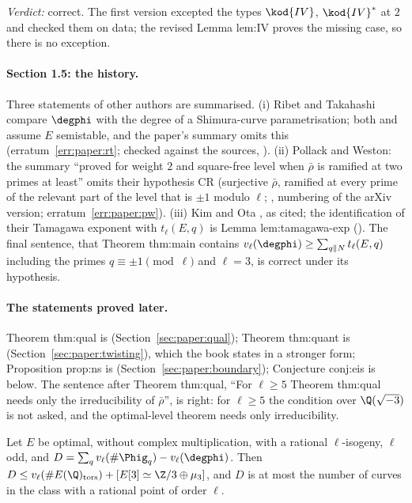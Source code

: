\begin{sloppypar}
\noindent\emph{Verdict:} correct. The first version excepted the types $\kod{IV}$, $\kod{IV}^*$ at $2$ and checked them on data; the revised Lemma lem:IV proves the
missing case, so there is no exception.

\paragraph{Section 1.5: the history.} Three statements of other authors are summarised. (i) Ribet and Takahashi compare $\degphi$ with the degree of a
Shimura-curve parametrisation; both \cite{RibetTakahashi97} and \cite{Takahashi01} assume $E$ semistable, and the paper's summary omits this
(erratum~\ref{err:paper:rt}; checked against the sources, ). (ii) Pollack and Weston: the summary ``proved for weight $2$ and square-free level
when $\bar\rho$ is ramified at two primes at least'' omits their hypothesis CR (surjective $\bar\rho$, ramified at every prime of the relevant part of the level
that is $\pm1$ modulo $\ell$; \cite[Section 1 and Theorem 6.11]{PollackWeston11}, numbering of the arXiv version; erratum~\ref{err:paper:pw}). (iii) Kim and Ota
\cite[Theorem 1.1]{KimOta}, as cited; the identification of their Tamagawa exponent with $t_\ell(E,q)$ is Lemma lem:tamagawa-exp (). The
final sentence, that Theorem thm:main contains $v_\ell(\degphi)\ge\sum_{q\|N}t_\ell(E,q)$ including the primes $q\equiv\pm1\pmod\ell$ and $\ell=3$, is correct under its
hypothesis.

\paragraph{The statements proved later.} Theorem thm:qual is  (Section~\ref{sec:paper:qual}); Theorem thm:quant is
 (Section~\ref{sec:paper:twisting}), which the book states in a stronger form; Proposition prop:ns is 
(Section~\ref{sec:paper:boundary}); Conjecture conj:eis is  below. The sentence after Theorem thm:qual, ``For $\ell\ge5$
Theorem thm:qual needs only the irreducibility of $\bar\rho$'', is right: for $\ell\ge5$ the condition over $\Q(\sqrt{-3})$ is not asked, and the optimal-level
theorem needs only irreducibility.

\begin{conjecture}\label{conj:paper:eis}
Let $E$ be optimal, without complex multiplication, with a rational $\ell$-isogeny, $\ell$ odd, and $D=\sum_qv_\ell(\#\Phig_q)-v_\ell(\degphi)$. Then
$D\le v_\ell(\#E(\Q)_{\mathrm{tors}})+[E[3]\simeq\Z/3\oplus\mu_3]$, and $D$ is at most the number of curves in the class with a rational point of order $\ell$.
\end{conjecture}


\end{sloppypar}
